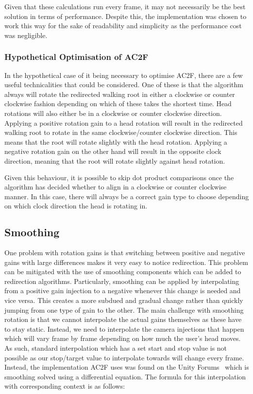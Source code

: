 Given that these calculations run every frame, it may not necessarily be the best solution in terms of performance. Despite this, the implementation was chosen to work this way for the sake of readability and simplicity as the performance cost was negligible. 

\subsubsection{Hypothetical Optimisation of AC2F}
In the hypothetical case of it being necessary to optimise AC2F, there are a few useful technicalities that could be considered. One of these is that the algorithm always will rotate the redirected walking root in either a clockwise or counter clockwise fashion depending on which of these takes the shortest time. Head rotations will also either be in a clockwise or counter clockwise direction. Applying a positive rotation gain to a head rotation will result in the redirected walking root to rotate in the same clockwise/counter clockwise direction. This means that the root will rotate slightly with the head rotation. Applying a negative rotation gain on the other hand will result in the opposite clock direction, meaning that the root will rotate slightly against head rotation. 

Given this behaviour, it is possible to skip dot product comparisons once the algorithm has decided whether to align in a clockwise or counter clockwise manner. In this case, there will always be a correct gain type to choose depending on which clock direction the head is rotating in.

\subsection{Smoothing}
One problem with rotation gains is that switching between positive and negative gains with large differences makes it very easy to notice redirection. This problem can be mitigated with the use of smoothing components which can be added to redirection algorithms. Particularly, smoothing can be applied by interpolating from a positive gain injection to a negative whenever this change is needed and vice versa. This creates a more subdued and gradual change rather than quickly jumping from one type of gain to the other. The main challenge with smoothing rotation is that we cannot interpolate the actual gains themselves as these have to stay static. Instead, we need to interpolate the camera injections that happen which will vary frame by frame depending on how much the user's head moves. As such, standard interpolation which has a set start and stop value is not possible as our stop/target value to interpolate towards will change every frame. Instead, the implementation AC2F uses was found on the Unity Forums~\cite{smoothingFormula} which is smoothing solved using a differential equation. The formula for this interpolation with corresponding context is as follows:


